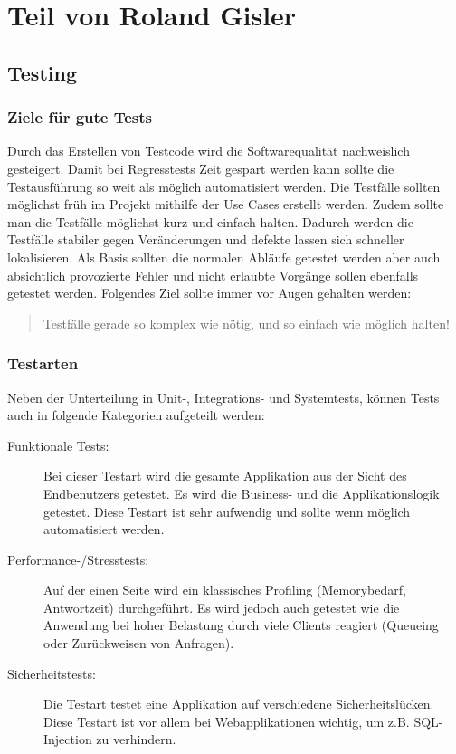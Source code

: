 \chapter{Teil von Roland Gisler}



\section{Testing}

\subsection{Ziele für gute Tests}

Durch das Erstellen von Testcode wird die Softwarequalität nachweislich gesteigert. Damit bei Regresstests Zeit gespart werden kann sollte die Testausführung so weit als möglich automatisiert werden. Die Testfälle sollten möglichst früh im Projekt mithilfe der Use Cases erstellt werden. Zudem sollte man die Testfälle möglichst kurz und einfach halten. Dadurch werden die Testfälle stabiler gegen Veränderungen und defekte lassen sich schneller lokalisieren. Als Basis sollten die normalen Abläufe getestet werden aber auch absichtlich provozierte Fehler und nicht erlaubte Vorgänge sollen ebenfalls getestet werden. Folgendes Ziel sollte immer vor Augen gehalten werden:
\begin{quote}
Testfälle gerade so komplex wie nötig, und so einfach wie möglich halten!
\end{quote}

\subsection{Testarten}

Neben der Unterteilung in Unit-, Integrations- und Systemtests, können Tests auch in folgende Kategorien aufgeteilt werden:
\begin{description}
	\item[Funktionale Tests:] Bei dieser Testart wird die gesamte Applikation aus der Sicht des Endbenutzers getestet. Es wird die Business- und die Applikationslogik getestet. Diese Testart ist sehr aufwendig und sollte wenn möglich automatisiert werden. 
	\item[Performance-/Stresstests:] Auf der einen Seite wird ein klassisches Profiling (Memorybedarf, Antwortzeit) durchgeführt. Es wird jedoch auch getestet wie die Anwendung bei hoher Belastung durch viele Clients reagiert (Queueing oder Zurückweisen von Anfragen).
	\item[Sicherheitstests:] Die Testart testet eine Applikation auf verschiedene Sicherheitslücken. Diese Testart ist vor allem bei Webapplikationen wichtig, um z.B. SQL-Injection zu verhindern.   
\end{description}

